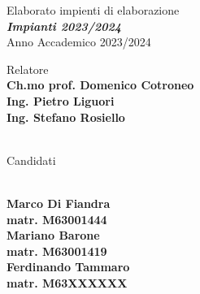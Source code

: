 \begin{titlepage}
	\thispagestyle{empty}
	\raggedright %
	
	
	\vfill
	
	{\large Elaborato impienti di elaborazione}
	\\[1cm]
	{\textbf{\textit{\LARGE Impianti 2023/2024}}}
	\\[1cm]
	{\large Anno Accademico 2023/2024}
	
	\vfill
	
	
	\begin{table}[h]
		Relatore
		\\
		\textbf{Ch.mo prof. Domenico Cotroneo}
		\\
		\textbf{Ing. Pietro Liguori}
		\\
		\textbf{Ing. Stefano Rosiello}
		\\ \\
		{\raggedright Candidati}
		\\
		\textbf{Marco Di Fiandra}
		\\
		\textbf{matr. M63001444}
		\\
		\textbf{Mariano Barone}
		\\
		\textbf{matr. M63001419}
		\\
		\textbf{Ferdinando Tammaro}
		\\
		\textbf{matr. M63XXXXXX}
	\end{table}
	
\end{titlepage}